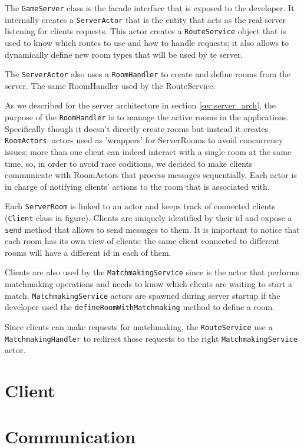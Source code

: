 The \texttt{GameServer} class is the facade interface that is exposed to the developer. It internally creates a \texttt{ServerActor} that is the entity that acts as the real server listening for clients requests. This actor creates a \texttt{RouteService} object that is used to know which routes to use and how to handle requests; it also allows to dynamically define new room types that will be used by te server. 

The \texttt{ServerActor} also uses a \texttt{RoomHandler} to create and define rooms from the server. The same RoomHandler used by the RouteService.

As we described for the server architecture in section \ref{sec:server_arch}, the purpose of the \texttt{RoomHandler} is to manage the active rooms in the applications. Specifically though it doesn't directly create rooms but instead it creates \texttt{RoomActors}: actors used as 'wrappers' for ServerRooms to avoid concurrency issues; more than one client can indeed interact with a single room at the same time, so, in order to avoid race coditions, we decided to make clients communicate with RoomActors that process messages sequentially. Each actor is in charge of notifying clients' actions to the room that is associated with.

Each \texttt{ServerRoom} is linked to an actor and keeps track of connected clients (\texttt{Client} class in figure). Clients are uniquely identified by their id and expose a \texttt{send} method that allows to send messages to them. It is important to notice that each room has its own view of clients: the same client connected to different rooms will have a different id in each of them. 

Clients are also used by the \texttt{MatchmakingService} since is the actor that performs matchmaking operations and needs to know which clients are waiting to start a match. \texttt{MatchmakingService} actors are spawned during server startup if the developer used the \texttt{defineRoomWithMatchmaking} method to define a room. 

Since clients can make requests for matchmaking, the \texttt{RouteService} use a \texttt{MatchmakingHandler} to redirect those requests to the right \texttt{MatchmakingService} actor.


\section{Client}

\section{Communication}\label{sec:communication_design}


